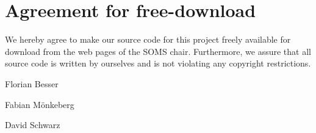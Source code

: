 \documentclass[11pt]{article}
\begin{document}

\newpage


\newpage
\section*{Agreement for free-download}
\bigskip


\bigskip


\large We hereby agree to make our source code for this project freely available for download from the web pages of the SOMS chair. Furthermore, we assure that all source code is written by ourselves and is not violating any copyright restrictions.

\begin{center}

\bigskip


\bigskip



\begin{minipage}{6cm}

\large Florian Besser

\end{minipage}
\bigskip \bigskip
\begin{minipage}{6cm}

\large Fabian M\"onkeberg

\end{minipage}
\bigskip
\begin{minipage}{6cm}

\large David Schwarz

\end{minipage}

\end{center}
\newpage







\tableofcontents
\end{document}
